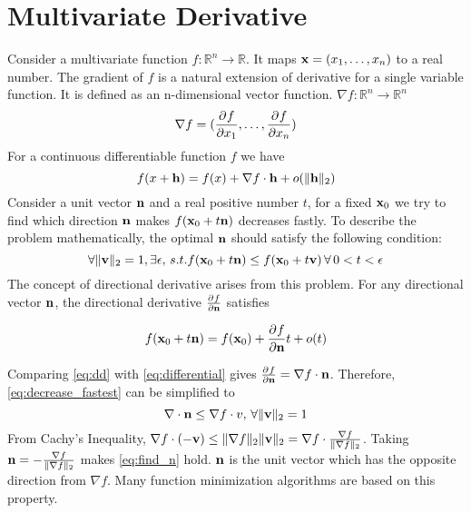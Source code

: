 \section{Multivariate Derivative}
Consider a multivariate function $f: \mathbb{R}^n \to \mathbb{R}$. It maps $\mathbf{x} = (x_1, \dots, x_n) $ to a real number.
The gradient of $f$ is a natural extension of derivative for a single variable function. It is defined as an n-dimensional vector function.
$\nabla f: \mathbb{R}^n \to \mathbb{R}^n $
\begin{equation}
\nabla f = (\frac{\partial^{} f}{\partial x_1}, \dots, \frac{\partial^{} f}{\partial x_n})
\end{equation}
For a continuous differentiable function $f$ we have 
\begin{equation}\label{eq:differential}
f(x + \mathbf{h} ) = f(x) + \nabla f \cdot \mathbf{h} + o(\lVert\mathbf{h}\rVert_2)
\end{equation}
Consider a unit vector $\mathbf{n}$ and a real positive number $t$, for a fixed $\mathbf{x}_0$ we try to find which direction $\mathbf{n}$ makes $f(\mathbf{x}_0 + t \mathbf{n})$ decreases fastly. To describe the problem mathematically, the optimal $\mathbf{n}$ should satisfy the following condition:
\begin{equation}\label{eq:decrease_fastest}
\forall \lVert\mathbf{v}\rVert_2=1, \exists \epsilon,  \, s.t. f(\mathbf{x}_0 + t \mathbf{n}) \leq f(\mathbf{x}_0 + t \mathbf{v}) \,\forall\, 0 < t < \epsilon
\end{equation}
The concept of directional derivative arises from this problem. For any directional vector $\mathbf{n}$, the directional derivative $\frac{\partial^{} f}{\partial \mathbf{n}}$ satisfies 

\begin{equation}\label{eq:dd}
f(\mathbf{x}_0 + t \mathbf{n}) = f(\mathbf{x}_0) + 
 \frac{\partial^{} f}{\partial \mathbf{n}} t + o(t)
 \end{equation}
 
Comparing \eqref{eq:dd} with \eqref{eq:differential} gives $\frac{\partial^{} f}{\partial \mathbf{n}} = \nabla f \cdot \mathbf{n}$.  Therefore, \eqref{eq:decrease_fastest} can be simplified to 
\begin{equation}\label{eq:find_n}
\nabla \cdot \mathbf{n} \leq \nabla f \cdot{v}, \, \forall \lVert\mathbf{v}\rVert_2=1
\end{equation}
From Cachy's Inequality, $ \nabla f \cdot (-\mathbf{v}) \leq \lVert\nabla f\rVert_2 \lVert\mathbf{v}\rVert_2 = \nabla f \cdot \frac{\nabla f}{\lVert\nabla f\rVert_2}$. Taking $\mathbf{n} = -  \frac{\nabla f}{\lVert\nabla f\rVert_2} $ makes \eqref{eq:find_n} hold.
$\mathbf{n}$ is the unit vector which has the  opposite direction from $\nabla f $. Many function minimization algorithms are based on this property.

